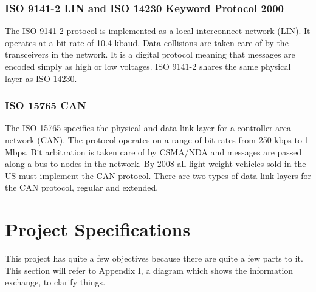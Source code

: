 \documentclass[12pt,letterpaper]{article}
\begin{document}
\subsubsection{ISO 9141-2 LIN and ISO 14230 Keyword Protocol 2000}
The ISO 9141-2 protocol is implemented as a local interconnect network (LIN). It operates at a bit rate of 10.4 kbaud. Data collisions are taken care of by the transceivers in the network. It is a digital protocol meaning that messages are encoded simply as high or low voltages. ISO 9141-2 shares the same physical layer as ISO 14230.

\subsubsection{ISO 15765 CAN}
The ISO 15765 specifies the physical and data-link layer for a controller area network (CAN). The protocol operates on a range of bit rates from 250 kbps to 1 Mbps. Bit arbitration is taken care of by CSMA/NDA and messages are passed along a bus to nodes in the network. By 2008 all light weight vehicles sold in the US must implement the CAN protocol. There are two types of data-link layers for the CAN protocol, regular and extended.

\newpage

\section{Project Specifications}
This project has quite a few objectives because there are quite a few parts to it. This section will refer to Appendix I, a diagram which shows the information exchange, to clarify things.
\end{document}
